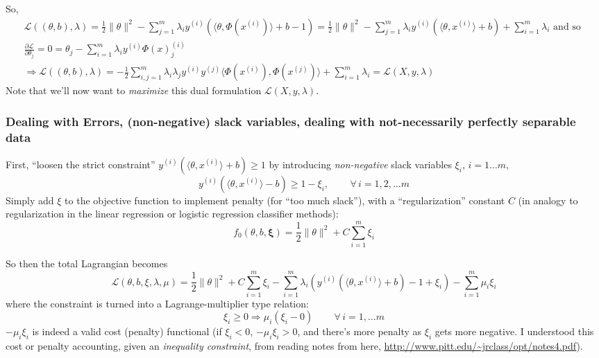 \documentclass[10pt]{amsart}
\begin{document}
\begin{multicols*}{2}
So,
\begin{equation}
  \begin{gathered}
    \mathcal{L}((\theta,b),\lambda) = \frac{1}{2} \| \theta\|^2 - \sum_{j=1}^m \lambda_i y^{(i)}(\langle \theta, \Phi(x^{(i)}) \rangle + b - 1)   =  \frac{1}{2} \| \theta\|^2 - \sum_{j=1}^m \lambda_i y^{(i)}(\langle \theta, x^{(i)} \rangle + b) +\sum_{i=1}^m \lambda_i \text{ and so } \\
    \frac{ \partial \mathcal{L}}{ \partial \theta_j} = 0 = \theta_j - \sum_{i=1}^m \lambda_i y^{(i)} \Phi(x)^{(i)}_j \\
    \Longrightarrow \mathcal{L}((\theta,b),\lambda) = -\frac{1}{2} \sum_{i,j=1}^m \lambda_i \lambda_j y^{(i)} y^{(j)} \langle \Phi(x^{(i)}) , \Phi(x^{(j)}) \rangle + \sum_{i=1}^m \lambda_i = \mathcal{L}(X,y,\lambda)
    \end{gathered}
  \end{equation}
Note that we'll now want to \emph{maximize} this dual formulation $\mathcal{L}(X,y,\lambda)$.  


\subsubsection{Dealing with Errors, (non-negative) slack variables, dealing with not-necessarily perfectly separable data}\label{SubSec:slackvars}

First, ``loosen the strict constraint'' $y^{(i)}(\langle \theta,x^{(i)} \rangle + b) \geq 1$ by introducing \emph{non-negative} slack variables $\xi_i$, $i=1\dots m$,
\begin{equation}
  y^{(i)}(\langle \theta, x^{(i)} \rangle - b) \geq 1 - \xi_i, \qquad \, \forall \, i = 1,2, \dots m 
\end{equation}
Simply add $\xi$ to the objective function to implement penalty (for ``too much slack''), with a ``regularization'' constant $C$ (in analogy to regularization in the linear regression or logistic regression classifier methods):
\begin{equation}
  f_0(\theta,b,\mathbf{\xi}) = \frac{1}{2} \| \theta \|^2 + C\sum_{i=1}^m \xi_i
  \end{equation}

So then the total Lagrangian becomes
\begin{equation}
  \mathcal{L}(\theta,b,\xi,\lambda,\mu) = \frac{1}{2} \| \theta \|^2 + C\sum_{i=1}^m \xi_i - \sum_{i=1}^m \lambda_i (y^{(i)}(\langle \theta,x^{(i)} \rangle +b)-1 +\xi_i ) - \sum_{i=1}^m \mu_i \xi_i
\end{equation}
where the constraint is turned into a Lagrange-multiplier type relation:
\begin{equation}
\xi_i \geq 0 \Longrightarrow \mu_i(\xi_i - 0) \qquad \, \forall \, i =1,\dots m 
\end{equation}
$-\mu_i\xi_i$ is indeed a valid cost (penalty) functional (if $\xi_i  <0$, $-\mu_i\xi_i >0$, and there's more penalty as $\xi_i$ gets more negative.  I understood this cost or penalty accounting, given an \emph{inequality constraint}, from reading notes from here, \url{http://www.pitt.edu/~jrclass/opt/notes4.pdf}).


\end{multicols*}
\end{document}
